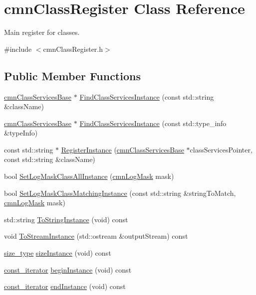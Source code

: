 \hypertarget{classcmn_class_register}{}\section{cmn\+Class\+Register Class Reference}
\label{classcmn_class_register}


Main register for classes.  




{\ttfamily \#include $<$cmn\+Class\+Register.\+h$>$}

\subsection*{Public Member Functions}
\begin{DoxyCompactItemize}
\item 
\hyperlink{classcmn_class_services_base}{cmn\+Class\+Services\+Base} $\ast$ \hyperlink{classcmn_class_register_a371f6f08b984969a6baf01405fe64301}{Find\+Class\+Services\+Instance} (const std\+::string \&class\+Name)
\item 
\hyperlink{classcmn_class_services_base}{cmn\+Class\+Services\+Base} $\ast$ \hyperlink{classcmn_class_register_a292c354f15d6308ec8ca7a8ca5393a48}{Find\+Class\+Services\+Instance} (const std\+::type\+\_\+info \&type\+Info)
\item 
const std\+::string $\ast$ \hyperlink{classcmn_class_register_a99073eb83fbe6d43abf70a8d00ad82e2}{Register\+Instance} (\hyperlink{classcmn_class_services_base}{cmn\+Class\+Services\+Base} $\ast$class\+Services\+Pointer, const std\+::string \&class\+Name)
\item 
bool \hyperlink{classcmn_class_register_afb45f0c62c3ae291136b54946d804d84}{Set\+Log\+Mask\+Class\+All\+Instance} (\hyperlink{cmn_log_lo_d_8h_a44b6ef7560b0d204460b0a54f1a5d702}{cmn\+Log\+Mask} mask)
\item 
bool \hyperlink{classcmn_class_register_a53cf9c570bc4a85a5e556702e07fa41d}{Set\+Log\+Mask\+Class\+Matching\+Instance} (const std\+::string \&string\+To\+Match, \hyperlink{cmn_log_lo_d_8h_a44b6ef7560b0d204460b0a54f1a5d702}{cmn\+Log\+Mask} mask)
\item 
std\+::string \hyperlink{classcmn_class_register_a25fde8d61752440d7d643e56173f2a7b}{To\+String\+Instance} (void) const 
\item 
void \hyperlink{classcmn_class_register_a8fc3ce4e51acecb0dc1192e1f805da1f}{To\+Stream\+Instance} (std\+::ostream \&output\+Stream) const 
\item 
\hyperlink{classcmn_class_register_ac90771194c85a9fff753d9d623071b01}{size\+\_\+type} \hyperlink{classcmn_class_register_a56096ffe39a5a4eee0ce6d8bf015184f}{size\+Instance} (void) const 
\item 
\hyperlink{classcmn_class_register_aacfef62640c83b00064eba6c1f667e26}{const\+\_\+iterator} \hyperlink{classcmn_class_register_ae18fd6eeb8f39168624bbc50a7c88e43}{begin\+Instance} (void) const 
\item 
\hyperlink{classcmn_class_register_aacfef62640c83b00064eba6c1f667e26}{const\+\_\+iterator} \hyperlink{classcmn_class_register_abaa15f6524d4c6ca44cadb161a2f14bf}{end\+Instance} (void) const 
\end{DoxyCompactItemize}

